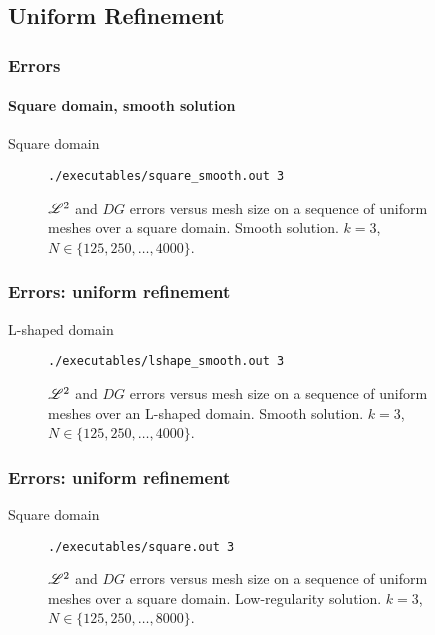 \subsection{Uniform Refinement}

\begin{frame}[fragile]
    \frametitle{Errors}
    \framesubtitle{Square domain, smooth solution}

    \begin{description}
        \item[Square domain] \lstinline{./executables/square_smooth.out 3}
    \end{description}    

    \begin{figure}[!ht]
        
        \caption{$\mathscr{L}^2$ and $DG$ errors versus mesh size on a sequence of uniform meshes over a square domain. Smooth solution. $k = 3$, $N \in \{125, 250, \dots, 4000\}$.}
    \end{figure}
\end{frame}

\begin{frame}[fragile]
    \frametitle{Errors: uniform refinement}

    \begin{description}
        \item[L-shaped domain] \lstinline{./executables/lshape_smooth.out 3}
    \end{description}

    \begin{figure}[!ht]
        
        \caption{$\mathscr{L}^2$ and $DG$ errors versus mesh size on a sequence of uniform meshes over an L-shaped domain. Smooth solution. $k = 3$, $N \in \{125, 250, \dots, 4000\}$.}
    \end{figure}
\end{frame}

\begin{frame}[fragile]
    \frametitle{Errors: uniform refinement}

    \begin{description}
        \item[Square domain] \lstinline{./executables/square.out 3}
    \end{description}    

    \begin{figure}[!ht]
        
        \caption{$\mathscr{L}^2$ and $DG$ errors versus mesh size on a sequence of uniform meshes over a square domain. Low-regularity solution. $k = 3$, $N \in \{125, 250, \dots, 8000\}$.}
    \end{figure}
\end{frame}

